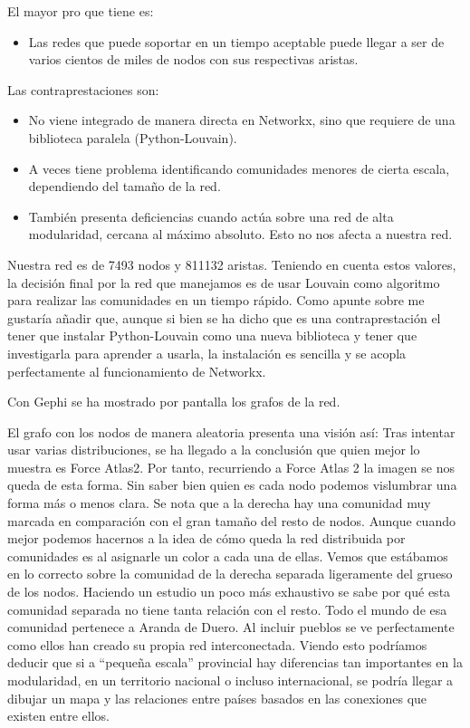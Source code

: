 El mayor pro que tiene es:
\begin{itemize}
	\item Las redes que puede soportar en un tiempo aceptable puede llegar a ser de varios cientos de miles de nodos con sus respectivas aristas.
\end{itemize}
Las contraprestaciones son:
\begin{itemize}
	\item No viene integrado de manera directa en Networkx, sino que requiere de una biblioteca paralela (Python-Louvain).
	\item A veces tiene problema identificando comunidades menores de cierta escala, dependiendo del tamaño de la red. 
	\item También presenta deficiencias cuando actúa sobre una red de alta modularidad, cercana al máximo absoluto. Esto no nos afecta a nuestra red.
\end{itemize}
Nuestra red es de 7493 nodos y 811132 aristas. Teniendo en cuenta estos valores, la decisión final por la red que manejamos es de usar Louvain como algoritmo para realizar las comunidades en un tiempo rápido.
Como apunte sobre me gustaría añadir que, aunque si bien se ha dicho que es una contraprestación el tener que instalar Python-Louvain como una nueva biblioteca y tener que investigarla para aprender a usarla, la instalación es sencilla y se acopla perfectamente al funcionamiento de Networkx.

Con Gephi se ha mostrado por pantalla los grafos de la red.

El grafo con los nodos de manera aleatoria presenta una visión así:
Tras intentar usar varias distribuciones, se ha llegado a la conclusión que quien mejor lo muestra es Force Atlas2. Por tanto, recurriendo a Force Atlas 2 la imagen se nos queda de esta forma. Sin saber bien quien es cada nodo podemos vislumbrar una forma más o menos clara. Se nota que a la derecha hay una comunidad muy marcada en comparación con el gran tamaño del resto de nodos.
Aunque cuando mejor podemos hacernos a la idea de cómo queda la red distribuida por comunidades es al asignarle un color a cada una de ellas. Vemos que estábamos en lo correcto sobre la comunidad de la derecha separada ligeramente del grueso de los nodos.
Haciendo un estudio un poco más exhaustivo se sabe por qué esta comunidad separada no tiene tanta relación con el resto. Todo el mundo de esa comunidad pertenece a Aranda de Duero. Al incluir pueblos se ve perfectamente como ellos han creado su propia red interconectada. Viendo esto podríamos deducir que si a “pequeña escala” provincial hay diferencias tan importantes en la modularidad, en un territorio nacional o incluso internacional, se podría llegar a dibujar un mapa y las relaciones entre países basados en las conexiones que existen entre ellos.

